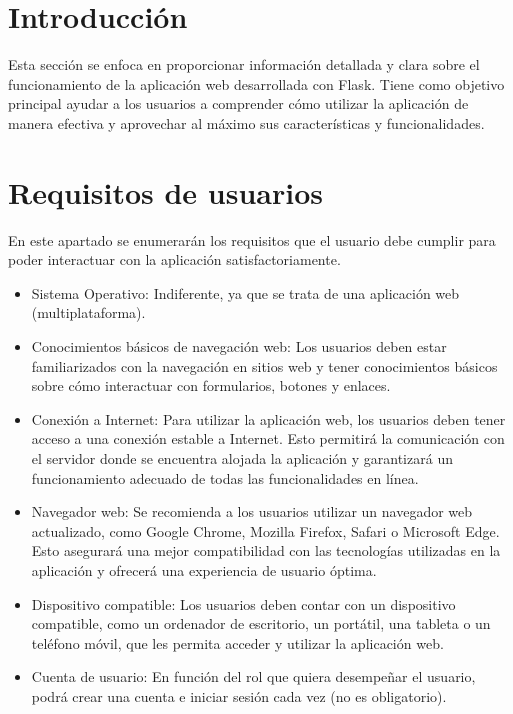 
\section{Introducción}
Esta sección se enfoca en proporcionar información detallada y clara sobre el funcionamiento de la aplicación web desarrollada con Flask. Tiene como objetivo principal ayudar a los usuarios a comprender cómo utilizar la aplicación de manera efectiva y aprovechar al máximo sus características y funcionalidades.

\section{Requisitos de usuarios}
En este apartado se enumerarán los requisitos que el usuario debe cumplir para poder interactuar con la aplicación satisfactoriamente.

\begin{itemize}
    \item Sistema Operativo: Indiferente, ya que se trata de una aplicación web (multiplataforma).
    
    \item Conocimientos básicos de navegación web: Los usuarios deben estar familiarizados con la navegación en sitios web y tener conocimientos básicos sobre cómo interactuar con formularios, botones y enlaces.
    
    \item Conexión a Internet: Para utilizar la aplicación web, los usuarios deben tener acceso a una conexión estable a Internet. Esto permitirá la comunicación con el servidor donde se encuentra alojada la aplicación y garantizará un funcionamiento adecuado de todas las funcionalidades en línea.

    \item Navegador web: Se recomienda a los usuarios utilizar un navegador web actualizado, como Google Chrome, Mozilla Firefox, Safari o Microsoft Edge. Esto asegurará una mejor compatibilidad con las tecnologías utilizadas en la aplicación y ofrecerá una experiencia de usuario óptima.
    
    \item Dispositivo compatible: Los usuarios deben contar con un dispositivo compatible, como un ordenador de escritorio, un portátil, una tableta o un teléfono móvil, que les permita acceder y utilizar la aplicación web.
    
    \item Cuenta de usuario: En función del rol que quiera desempeñar el usuario, podrá crear una cuenta e iniciar sesión cada vez (no es obligatorio).

\end{itemize}


